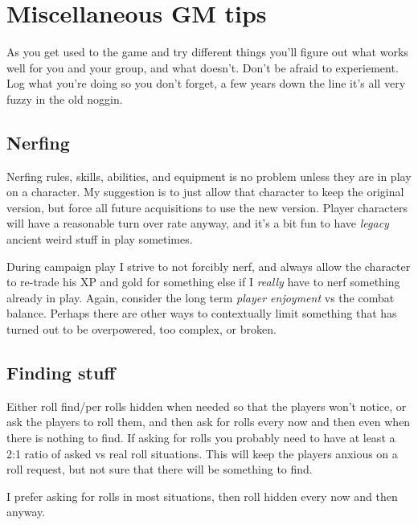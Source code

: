 
\section*{Miscellaneous GM tips}

As you get used to the game and try different things you'll figure out what works well for you and your group, and what doesn't. Don't be afraid to experiement. Log what you're doing so you don't forget, a few years down the line it's all very fuzzy in the old noggin.


\subsection*{Nerfing}
Nerfing rules, skills, abilities, and equipment is no problem unless they are in play on a character. My suggestion is to just allow that character to keep the original version, but force all future acquisitions to use the new version. Player characters will have a reasonable turn over rate anyway, and it's a bit fun to have \emph{legacy} ancient weird stuff in play sometimes.

During campaign play I strive to not forcibly nerf, and always allow the character to re-trade his XP and gold for something else if I \emph{really} have to nerf something already in play. Again, consider the long term \emph{player enjoyment} vs the combat balance. Perhaps there are other ways to contextually limit something that has turned out to be overpowered, too complex, or broken.


\subsection*{Finding stuff}
Either roll find/per rolls hidden when needed so that the players won't notice, or ask the players to roll them, and then ask for rolls every now and then even when there is nothing to find. If asking for rolls you probably need to have at least a 2:1 ratio of asked vs real roll situations. This will keep the players anxious on a roll request, but not sure that there will be something to find.

I prefer asking for rolls in most situations, then roll hidden every now and then anyway.


